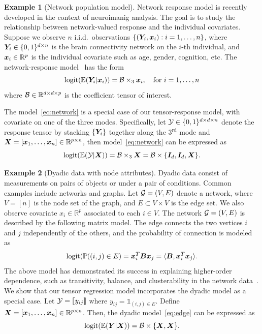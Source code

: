 \documentclass[twoside]{article}
\theoremstyle{plain}
\theoremstyle{definition}
\newtheorem{example}{Example}
\begin{document}
\begin{example}[Network population model] 
Network response model is recently developed in the context of neuroimanig analysis. The goal is to study the relationship between network-valued response and the individual covariates. Suppose we observe $n$ i.i.d.\ observations $\{(\bm Y_i, \bm x_i): i=1,\ldots,n\}$, where $\bm Y_i\in\{0,1\}^{d\times n}$ is the brain connectivity network on the $i$-th individual, and $\bm x_i\in\mathbb{R}^p$ is the individual covariate such as age, gender, cognition, etc. The network-response model~\cite{rabusseau2016low, zhang2018network} has the form
\begin{equation}\label{eq:network}
\text{logit}(\mathbb{E}(\bm Y_i|\bm x_i))=\mathcal{B}\times_3\bm x_i, \quad \text{for }i=1,\ldots,n
\end{equation}
where $\mathcal{B}\in \mathbb{R}^{d\times d\times p}$ is the coefficient tensor of interest. 

The model~\eqref{eq:network} is a special case of our tensor-response model, with covariate on one of the three modes. Specifically, let $\mathcal{Y}\in\{0,1\}^{d\times d\times n}$ denote the response tensor by stacking $\{\bm Y_i\}$ together along the 3$^\text{rd}$ mode and $\bm X=[\bm x_1,\ldots,\bm x_n]\in\mathbb{R}^{p\times n}$, then model~\eqref{eq:network} can be expressed as 
\[
\text{logit}(\mathbb{E}(\mathcal{Y}|\bm X))=\mathcal{B}\times_3 \bm X=\mathcal{B}\times\{\bm I_d, \bm I_d, \bm X\}.
\]
 \end{example}
 
 \begin{example}[Dyadic data with node attributes] Dyadic data consist of measurements on pairs of objects or under a pair of conditions. Common examples include networks and graphs. Let $\mathcal{G}=(V,E)$ denote a network, where $V=[n]$ is the node set of the graph, and $E\subset V\times V$ is the edge set. We also observe covariate $x_i\in\mathbb{R}^p$ associated to each $i\in V$. The network $\mathcal{G}=(V,E)$ is described by the following matrix model. The edge connects the two vertices $i$ and $j$ independently of the others, and the probability of connection is modeled as
\begin{equation}\label{eq:edge}
 \text{logit}(\mathbb{P}((i,j)\in E)=\bm x^T_i\bm B\bm x_j=\langle \bm B, \bm x^T_i\bm x_j\rangle.
 \end{equation}
The above model has demonstrated its success in explaining higher-order dependence, such as transitivity, balance, and clusterability in the network data~\cite{hoff2005bilinear}. We show that our tensor regression model incorporates the dyadic model as a special case. Let $\mathcal{Y}=\llbracket y_{ij} \rrbracket$ where $y_{ij}=\mathds{1}_{(i,j)\in E}$. Define $\bm X=[\bm x_1,\ldots,\bm x_n]\in\mathbb{R}^{p\times n}$. Then, the dyadic model~\eqref{eq:edge} can be expressed as
 \[
 \text{logit}(\mathbb{E}(\bm Y|\bm X))=\mathcal{B}\times\{\bm X,\bm X\}.
 \]
\end{example}
\end{document}
